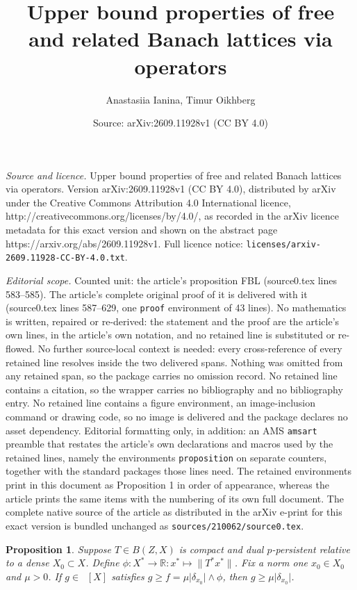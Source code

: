 \documentclass[10pt,a4paper]{amsart}
\title{Upper bound properties of free and related Banach lattices via operators}
\author{Anastasiia Ianina, Timur Oikhberg}
\date{Source: arXiv:2609.11928v1 (CC BY 4.0)}
\newtheorem{proposition}{Proposition}
\DeclareMathOperator{\FBLp}{FBL^{\mathit{(p)}}}
\newcommand{\R}{\mathbb{R}}
\begin{document}
\maketitle

\noindent\emph{Source and licence.} Upper bound properties of free and related Banach lattices via operators. Version arXiv:2609.11928v1 (CC BY 4.0), distributed by arXiv under the Creative Commons Attribution 4.0 International licence, http://creativecommons.org/licenses/by/4.0/, as recorded in the arXiv licence metadata for this exact version and shown on the abstract page https://arxiv.org/abs/2609.11928v1. Full licence notice: \texttt{licenses/arxiv-2609.11928-CC-BY-4.0.txt}.\par\smallskip

\noindent\textit{Editorial scope.} Counted unit: the article's proposition FBL (source0.tex lines 583--585). The article's complete original proof of it is delivered with it (source0.tex lines 587--629, one \texttt{proof} environment of 43 lines). No mathematics is written, repaired or re-derived: the statement and the proof are the article's own lines, in the article's own notation, and no retained line is substituted or re-flowed.  No further source-local context is needed: every cross-reference of every retained line resolves inside the two delivered spans.  Nothing was omitted from any retained span, so the package carries no omission record.  No retained line contains a citation, so the wrapper carries no bibliography and no bibliography entry.  No retained line contains a figure environment, an image-inclusion command or drawing code, so no image is delivered and the package declares no asset dependency.  Editorial formatting only, in addition: an AMS \texttt{amsart} preamble that restates the article's own declarations and macros used by the retained lines, namely the environments \texttt{proposition} on separate counters, together with the standard packages those lines need.  The retained environments print in this document as Proposition 1 in order of appearance, whereas the article prints the same items with the numbering of its own full document.  The complete native source of the article as distributed in the arXiv e-print for this exact version is bundled unchanged as \texttt{sources/210062/source0.tex}.
\begin{proposition}\label{supremum in FBL}
Suppose $T \in B(Z,X)$ is compact and dual $p$-persistent relative to a dense $X_0 \subset X$. Define $\phi : X^* \to \R : x^* \mapsto \|T^*x^*\|$. Fix a norm one $x_0 \in X_0$ and $\mu > 0$. If $g \in \FBLp[X]$ satisfies $g \geq f = \mu \big| \delta_{x_0} \big| \wedge \phi$, then $g \geq \mu \big| \delta_{x_0} \big|$.
\end{proposition}
\end{document}
